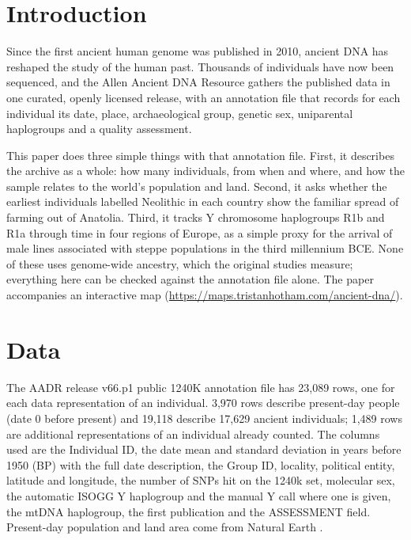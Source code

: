 \documentclass[11pt,a4paper]{article}
\begin{document}
\section{Introduction}
Since the first ancient human genome was published in 2010, ancient DNA has reshaped the study of the human past. Thousands of individuals have now been sequenced, and the Allen Ancient DNA Resource \citep{aadr,aadrpaper} gathers the published data in one curated, openly licensed release, with an annotation file that records for each individual its date, place, archaeological group, genetic sex, uniparental haplogroups and a quality assessment.

This paper does three simple things with that annotation file. First, it describes the archive as a whole: how many individuals, from when and where, and how the sample relates to the world's population and land. Second, it asks whether the earliest individuals labelled Neolithic in each country show the familiar spread of farming out of Anatolia. Third, it tracks Y chromosome haplogroups R1b and R1a through time in four regions of Europe, as a simple proxy for the arrival of male lines associated with steppe populations in the third millennium BCE. None of these uses genome-wide ancestry, which the original studies measure; everything here can be checked against the annotation file alone. The paper accompanies an interactive map (\url{https://maps.tristanhotham.com/ancient-dna/}).

\section{Data}
The AADR release v66.p1 public 1240K annotation file has 23,089 rows, one for each data representation of an individual. 3,970 rows describe present-day people (date 0 before present) and 19,118 describe 17,629 ancient individuals; 1,489 rows are additional representations of an individual already counted. The columns used are the Individual ID, the date mean and standard deviation in years before 1950 (BP) with the full date description, the Group ID, locality, political entity, latitude and longitude, the number of SNPs hit on the 1240k set, molecular sex, the automatic ISOGG Y haplogroup and the manual Y call where one is given, the mtDNA haplogroup, the first publication and the ASSESSMENT field. Present-day population and land area come from Natural Earth \citep{naturalearth}.
\end{document}
